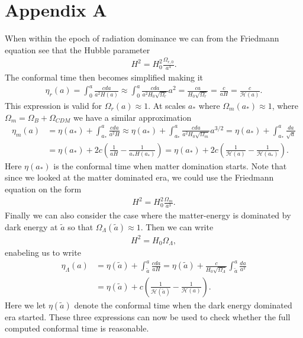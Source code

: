 \documentclass[twocolumn]{aastex62}
\begin{document}
\section{Appendix A} \label{apx:A}
When within the epoch of radiation dominance we can from the Friedmann equation
see that the Hubble parameter
\begin{align}
    H^2 = H_0^2 \frac{\Omega_{r,0}}{a^4}.
\end{align}
The conformal time then becomes simplified making it 
\begin{align}
    \eta_r(a) = \int_0^a \frac{c da}{a^2 H(a)} \approx \int_0^a\frac{c da}{a^2 H_0 \sqrt{\Omega_r}}a^2 = \frac{ca}{H_0\sqrt{\Omega_r}} = \frac{c}{aH} = \frac{c}{\mathcal{H}(a)}. 
\end{align}
This expression is valid for $\Omega_r(a) \approx 1$. At scales $a_*$ where $\Omega_m(a_*)\approx
1$, where $\Omega_m = \Omega_B + \Omega_{CDM}$ we have a similar approximation
\begin{align}
    \eta_m(a) &= \eta(a_*) + \int_{a_*}^a \frac{cda}{a^2H} \approx \eta(a_*) + \int_{a_*}^a \frac{cda}{a^2H_0\sqrt{\Omega_m}}a^{3/2} = \eta(a_*) + \int_{a_*}^a \frac{da}{\sqrt{a}} \\
    &= \eta(a_*) + 2c\left(\frac{1}{aH} - \frac{1}{a_*H(a_*)}\right) = \eta(a_*) + 2c\left(\frac{1}{\mathcal{H}(a)} - \frac{1}{\mathcal{H}(a_*)}\right).
\end{align}
Here $\eta(a_*)$ is the conformal time when matter domination starts. Note that
since we looked at the matter dominated era, we could use the Friedmann
equation on the form 
\begin{align}
    H^2 = H_0^2 \frac{\Omega_m}{a^3}.
\end{align}
Finally we can also consider the case where the matter-energy is dominated by
dark energy at $\tilde{a}$ so that $\Omega_\Lambda(\tilde{a})\approx 1$. Then we
can write 
\begin{align}
    H^2 = H_0 \Omega_\Lambda, 
\end{align}
enabeling us to write 
\begin{align}
    \eta_\Lambda(a) &= \eta(\tilde{a}) + \int_{\tilde{a}}^a\frac{cda}{aH} = \eta(\tilde{a}) + \frac{c}{H_0\sqrt{\Omega_\Lambda}}\int_{\tilde{a}}^a\frac{da}{a^2} \\
    &= \eta(\tilde{a}) + c\left(\frac{1}{\mathcal{H}(\tilde{a})} - \frac{1}{\mathcal{H}(a)}\right).
\end{align}
Here we let $\eta(\tilde{a})$ denote the conformal time when the dark energy
dominated era started. These three expressions can now be used to check whether
the full computed conformal time is reasonable.
\end{document}
